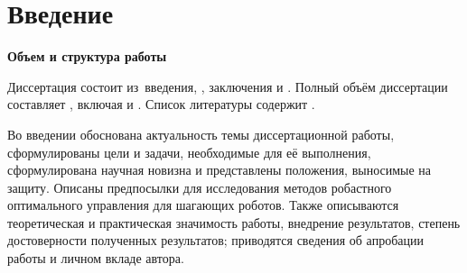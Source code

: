 \chapter*{Введение}                         %

\newcommand{\actuality}{\textbf{\actualityTXT}}
\newcommand{\progress}{\textbf{\progressTXT}}
\newcommand{\objectsubject}{\textbf{\objectsubjectTXT}}
\newcommand{\aimtasks}{\textbf{\aimtasksTXT}}
\newcommand{\methods}{\textbf{\methodsTXT}}
\newcommand{\defpositions}{\textbf{\defpositionsTXT}}
\newcommand{\compliances}{\textbf{\complianceTXT}}
\newcommand{\novelty}{\textbf{\noveltyTXT}}
\newcommand{\probation}{\textbf{\probationTXT}}
\newcommand{\influence}{\textbf{\influenceTXT}}
\newcommand{\reliability}{\textbf{\reliabilityTXT}}
\newcommand{\publications}{\textbf{\publicationsTXT}}
\newcommand{\contribution}{\textbf{\contributionTXT}}


\textbf{Объем и структура работы} 

Диссертация состоит из~введения,
,
заключения и
.
%
Полный объём диссертации составляет
, включая
 и
.
Список литературы содержит
.

Во введении обоснована актуальность темы диссертационной работы, сформулированы цели и задачи, необходимые для её выполнения, сформулирована научная новизна и представлены положения, выносимые на защиту. Описаны предпосылки для исследования методов робастного оптимального управления для шагающих роботов. Также описываются теоретическая и практическая значимость работы, внедрение результатов, степень достоверности полученных результатов; приводятся сведения об апробации работы и личном вкладе автора. 

